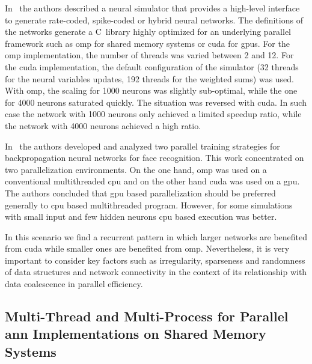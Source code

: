 \documentclass[11pt,a4paper]{article}
\newcommand{\CC}{C\nolinebreak\hspace{-.05em}\raisebox{.4ex}{\tiny\bf +}\nolinebreak\hspace{-.10em}\raisebox{.4ex}{\tiny\bf +}}
\begin{document}
In~\cite{10.3389/fninf.2015.00019} the authors described a neural simulator that provides a high-level interface to generate rate-coded, spike-coded or hybrid neural networks. The definitions of the networks generate a \CC~library highly optimized for an underlying parallel framework such as \gls{omp} for shared memory systems or \gls{cuda} for \glspl{gpu}. For the \gls{omp} implementation, the number of threads was varied between 2 and 12. For the \gls{cuda} implementation, the default configuration of the simulator (32 threads for the neural variables updates, 192 threads for the weighted sums) was used. With \gls{omp}, the scaling for 1000 neurons was slightly sub-optimal, while the one for 4000 neurons saturated quickly. The situation was reversed with \gls{cuda}. In such case the network with 1000 neurons only achieved a limited speedup ratio, while the network with 4000 neurons achieved a high ratio.

In~\cite{HUQQANI2013349} the authors developed and analyzed two parallel training strategies for backpropagation neural networks for face recognition. This work concentrated on two parallelization environments. On the one hand, \gls{omp} was used on a conventional multithreaded \gls{cpu} and on the other hand \gls{cuda} was used on a \gls{gpu}. The authors concluded that \gls{gpu} based parallelization should be preferred generally to \gls{cpu} based multithreaded program. However, for some simulations with small input and few hidden neurons \gls{cpu} based execution was better.

In this scenario we find a recurrent pattern in which larger networks are benefited from \gls{cuda} while smaller ones are benefited from \gls{omp}. Nevertheless, it is very important to consider key factors such as irregularity, sparseness and randomness of data structures and network connectivity in the context of its relationship with data coalescence in parallel efficiency.
























\subsection{Multi-Thread and Multi-Process for Parallel \gls{ann} Implementations on Shared Memory Systems}
\end{document}
